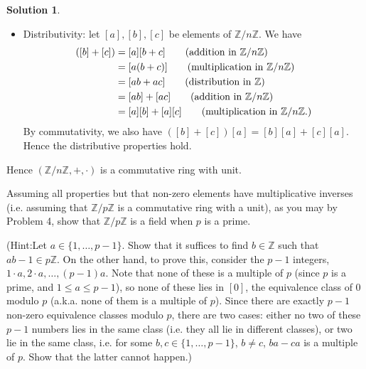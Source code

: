 \documentclass[12pt]{article}
\theoremstyle{definition}
\theoremstyle{definition}
\newtheorem*{soln}{Solution}
\newcommand{\Z}{\mathbb{Z}}
\begin{document}
\begin{soln}
\begin{itemize}
\item Distributivity: let $[a], [b], [c]$ be elements of $\Z/n\Z$. We have
\begin{align*}
[a]\left([b]+[c]\right) &= [a][b+c] \tag{addition in $\Z/n\Z$}\\
&= [a(b+c)] \tag{multiplication in $\Z/n\Z$}\\
&= [ab+ac] \tag{distribution in $\Z$}\\
&= [ab]+[ac] \tag{addition in $\Z/n\Z$}\\
&= [a][b]+[a][c] \tag{multiplication in $\Z/n\Z$.}
\end{align*}
By commutativity, we also have $([b]+[c])[a]=[b][a]+[c][a]$. Hence the distributive properties hold.
\end{itemize}
Hence $(\Z/n\Z,+,\cdot)$ is a commutative ring with unit.
\end{soln}

\begin{prob}
Assuming all properties but that non-zero elements have multiplicative inverses (i.e. assuming that $\Z/p\Z$ is a commutative ring with a unit), as you may by Problem 4, show that $\Z/p\Z$ is a field when $p$ is a prime.

{\small (Hint:Let $a\in\{1,\dots,p-1\}$.  Show that it suffices to find $b\in\Z$ such that $ab-1\in p\Z$.  On the other hand, to prove this, consider the $p-1$ integers, $1\cdot a,2\cdot a,\dots,(p-1)a$.  Note that none of these is a multiple of $p$ (since $p$ is a prime, and $1\le a\le p-1$), so none of these lies in $[0]$, the equivalence class of 0 modulo $p$ (a.k.a. none of them is a multiple of $p$).  Since there are exactly $p-1$ non-zero equivalence classes modulo $p$, there are two cases: either no two of these $p-1$ numbers lies in the same class (i.e. they all lie in different classes), or two lie in the same class, i.e. for  some $b, c\in\{1,\dots,p-1\}$, $b\neq c$, $ba-ca$ is a multiple of $p$. Show that the latter cannot happen.)}
\end{prob}
\end{document}
